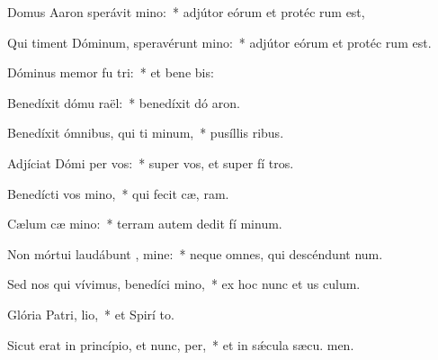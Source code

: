 \item Domus Aaron sperávit  mino:~* adjútor eórum et protéc rum est,
\item Qui timent Dóminum, speravérunt  mino:~* adjútor eórum et protéc rum est.
\item Dóminus memor fu tri:~* et bene bis:
\item Benedíxit dómu raël:~* benedíxit dó aron.
\item Benedíxit ómnibus, qui ti minum,~* pusíllis  ribus.
\item Adjíciat Dómi per vos:~* super vos, et super fí tros.
\item Benedícti vos  mino,~* qui fecit cæ,  ram.
\item Cælum cæ mino:~* terram autem dedit fí minum.
\item Non mórtui laudábunt , mine:~* neque omnes, qui descéndunt  num.
\item Sed nos qui vívimus, benedíci mino,~* ex hoc nunc et us  culum.
\item Glória Patri,  lio,~* et Spirí to.
\item Sicut erat in princípio, et nunc,  per,~* et in sǽcula sæcu. men.
